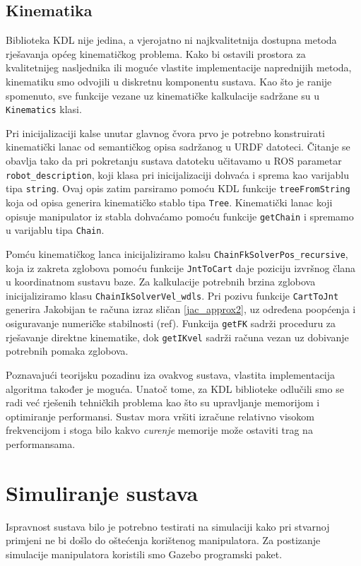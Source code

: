 \documentclass[times, utf8, diplomski, numeric]{fer}
\begin{document}
\subsection{Kinematika}
Biblioteka KDL nije jedina, a vjerojatno ni najkvalitetnija dostupna metoda rješavanja općeg kinematičkog problema.
Kako bi ostavili prostora za kvalitetnijeg nasljednika ili moguće vlastite implementacije naprednijih metoda, kinematiku smo odvojili u diskretnu komponentu sustava.
Kao što je ranije spomenuto, sve funkcije vezane uz kinematičke kalkulacije sadržane su u  \texttt{Kinematics} klasi.

Pri inicijalizaciji kalse unutar glavnog čvora prvo je potrebno konstruirati kinematički lanac od semantičkog opisa sadržanog u URDF datoteci.
Čitanje se obavlja tako da pri pokretanju sustava datoteku učitavamo u ROS parametar \texttt{robot\_description}, koji klasa pri inicijalizaciji dohvaća i sprema kao varijablu tipa \texttt{string}.
Ovaj opis zatim parsiramo pomoću KDL funkcije  \texttt{treeFromString} koja od opisa generira kinematičko stablo tipa \texttt{Tree}.
Kinematički lanac koji opisuje manipulator iz stabla dohvaćamo pomoću funkcije \texttt{getChain} i spremamo u varijablu tipa \texttt{Chain}.

Pomću kinematičkog lanca inicijaliziramo kalsu \texttt{ChainFkSolverPos\_recur\-sive}, koja iz zakreta zglobova pomoću funkcije \texttt{JntToCart} daje poziciju izvršnog člana u koordinatnom sustavu baze.
Za kalkulacije potrebnih brzina zglobova inicijaliziramo klasu \texttt{ChainIkSolverVel\_wdls}.
Pri pozivu funkcije \texttt{CartToJnt} generira Jakobijan te računa izraz sličan \ref{jac_approx2}, uz određena poopćenja i osiguravanje numeričke stabilnosti (ref).
Funkcija \texttt{getFK} sadrži proceduru za rješavanje direktne kinematike, dok \texttt{getIKvel} sadrži računa vezan uz dobivanje potrebnih pomaka zglobova.

Poznavajući teorijsku pozadinu iza ovakvog sustava, vlastita implementacija algoritma također je moguća.
Unatoč tome, za KDL biblioteke odlučili smo se radi već rješenih tehničkih problema kao što su upravljanje memorijom i optimiranje performansi.
Sustav mora vršiti izračune relativno visokom frekvencijom i stoga bilo kakvo \textit{curenje} memorije može ostaviti trag na performansama.

\section{Simuliranje sustava}\label{simuliranje}
Ispravnost sustava bilo je potrebno testirati na simulaciji kako pri stvarnoj primjeni ne bi došlo do oštećenja korištenog manipulatora.
Za postizanje simulacije manipulatora koristili smo Gazebo programski paket.
\end{document}
